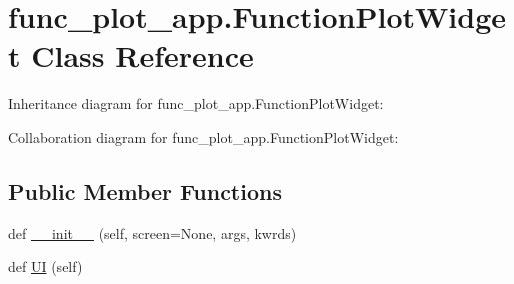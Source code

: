 \hypertarget{classfunc__plot__app_1_1FunctionPlotWidget}{}\section{func\+\_\+plot\+\_\+app.\+Function\+Plot\+Widget Class Reference}
\label{classfunc__plot__app_1_1FunctionPlotWidget}


Inheritance diagram for func\+\_\+plot\+\_\+app.\+Function\+Plot\+Widget\+:


Collaboration diagram for func\+\_\+plot\+\_\+app.\+Function\+Plot\+Widget\+:
\subsection*{Public Member Functions}
\begin{DoxyCompactItemize}
\item 
def \hyperlink{classfunc__plot__app_1_1FunctionPlotWidget_a88a6f62b32a5d24f3a759717e02fe3c7}{\+\_\+\+\_\+init\+\_\+\+\_\+} (self, screen=None, args, kwrds)
\item 
def \hyperlink{classfunc__plot__app_1_1FunctionPlotWidget_a85c675a92a1bb123ab20e6c859614fae}{UI} (self)
\end{DoxyCompactItemize}
